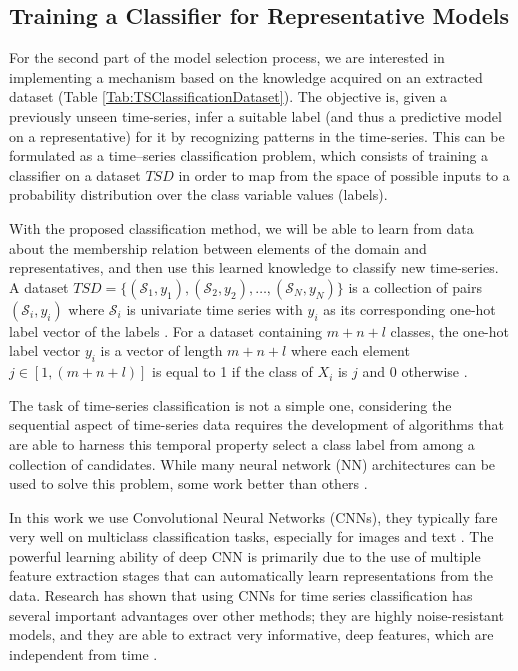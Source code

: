 \subsection{Training a Classifier for Representative Models}
\label{Sec:TrainingClassifier}
For the second part of the model selection process, we are interested in implementing a mechanism based on the knowledge acquired on an extracted dataset (Table \ref{Tab:TSClassificationDataset}). The objective is, given a previously unseen time-series, infer a suitable label (and thus a predictive model on a representative) for it by recognizing patterns in the time-series. This can be formulated as a time--series classification problem, which consists of training a classifier on a dataset $TSD$ in order to map from the space of possible inputs to a probability distribution over the class variable values (labels). 

With the proposed classification method, we will be able to learn from data about the membership relation between elements of the domain and representatives, and then use this learned knowledge to classify new time-series. A dataset $TSD=\{(\mathcal{S}_1,y_1),(\mathcal{S}_2,y_2), \ldots ,(\mathcal{S}_N,y_N)\}$ is a collection of pairs $(\mathcal{S}_i,y_i)$ where $\mathcal{S}_i$ is univariate time series with $y_i$ as its corresponding one-hot label vector of the labels \cite{Gulli2017}. For a dataset containing $m+n+l$ classes, the one-hot label vector $y_i$ is a vector of length $m+n+l$ where each element $j \in [1,(m+n+l)]$ is equal to 1 if the class of $X_i$ is $j$ and $0$ otherwise \cite{Mitsa2010}.

The task of time-series classification is not a simple one, considering the sequential aspect of time-series data requires the development of algorithms that are able to harness this temporal property select a class label from among a collection of candidates. While many neural network (NN) architectures can be used to solve this problem, some work better than others \cite{Bagnall2017a}. 

In this work we use Convolutional Neural Networks (CNNs), they typically fare very well on multiclass classification tasks, especially for images and text \cite{Goodfellow2016}. The powerful learning ability of deep CNN is primarily due to the use of multiple feature extraction stages that can automatically learn representations from the data. Research has shown that using CNNs for time series classification has several important advantages over other methods; they are highly noise-resistant models, and they are able to extract very informative, deep features, which are independent from time \cite{Wang2016, Bagnall2017a, Zhao2017}.


